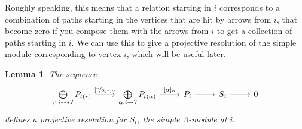 \documentclass[12pt, dvipsnames, oneside]{amsart}
\newtheorem{lemma}[theorem]{Lemma}
\theoremstyle{definition}
\begin{document}
Roughly speaking, this means that a relation starting in $i$ corresponds to a combination of paths starting in the vertices that are hit by arrows from $i$, that become zero if you compose them with the arrows from $i$ to get a collection of paths starting in $i$. We can use this to give a projective resolution of the simple module corresponding to vertex $i$, which will be useful later.

\bigskip

\begin{lemma}\label{lemma:projres}
The sequence
\begin{equation*}
\begin{tikzcd}
\bigoplus\limits_{r:i\dashrightarrow ?} P_{t(r)} \arrow[r, "{[ \sfrac{r}{\alpha} ]_{r,\alpha}}"] & \bigoplus\limits_{\alpha: i\rightarrow ?} P_{t(\alpha)} \arrow[r, "{[\alpha]_\alpha}"] & P_i \arrow[r] & S_i \arrow[r] & 0
\end{tikzcd}
\end{equation*}
defines a projective resolution for $S_i$, the simple $\Lambda$-module at $i$.
\end{lemma}
\end{document}
